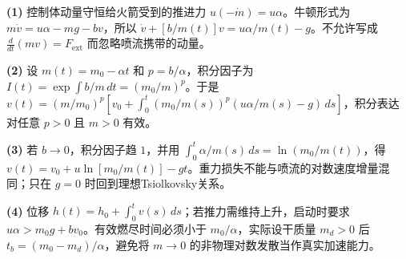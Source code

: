 \par\noindent\textbf{(1)} 控制体动量守恒给火箭受到的推进力 \(u(-\dot m)=u\alpha\)。牛顿形式为 \(m\dot v=u\alpha-mg-bv\)，所以 \(\dot v+[b/m(t)]v=u\alpha/m(t)-g\)。不允许写成 \(\frac{d}{dt}(mv)=F_{\mathrm{ext}}\) 而忽略喷流携带的动量。
\par\noindent\textbf{(2)} 设 \(m(t)=m_0-\alpha t\) 和 \(p=b/\alpha\)，积分因子为 \(I(t)=\exp\int b/m\,dt=(m_0/m)^p\)。于是 \(v(t)=(m/m_0)^p\left[v_0+\int_0^t(m_0/m(s))^p(u\alpha/m(s)-g)\,ds\right]\)，积分表达对任意 \(p>0\) 且 \(m>0\) 有效。
\par\noindent\textbf{(3)} 若 \(b\to0\)，积分因子趋 \(1\)，并用 \(\int_0^t \alpha/m(s)\,ds=\ln(m_0/m(t))\)，得 \(v(t)=v_0+u\ln[m_0/m(t)]-gt\)。重力损失不能与喷流的对数速度增量混同；只在 \(g=0\) 时回到理想Tsiolkovsky关系。
\par\noindent\textbf{(4)} 位移 \(h(t)=h_0+\int_0^t v(s)\,ds\)；若推力需维持上升，启动时要求 \(u\alpha>m_0g+bv_0\)。有效燃尽时间必须小于 \(m_0/\alpha\)，实际设干质量 \(m_d>0\) 后 \(t_b=(m_0-m_d)/\alpha\)，避免将 \(m\to0\) 的非物理对数发散当作真实加速能力。
